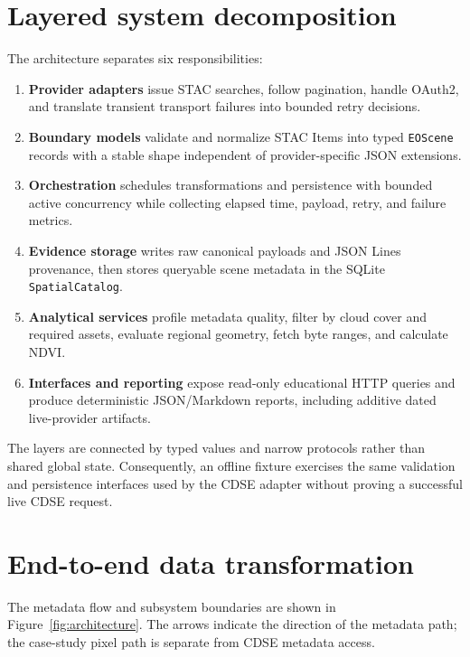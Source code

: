 \section{Layered system decomposition}

The architecture separates six responsibilities:

\begin{enumerate}
\item \textbf{Provider adapters} issue STAC searches, follow pagination, handle OAuth2, and
translate transient transport failures into bounded retry decisions.
\item \textbf{Boundary models} validate and normalize STAC Items into typed \texttt{EOScene}
records with a stable shape independent of provider-specific JSON extensions.
\item \textbf{Orchestration} schedules transformations and persistence with bounded active
concurrency while
collecting elapsed time, payload, retry, and failure metrics.
\item \textbf{Evidence storage} writes raw canonical payloads and JSON Lines provenance, then stores
queryable scene metadata in the SQLite \texttt{SpatialCatalog}.
\item \textbf{Analytical services} profile metadata quality, filter by cloud cover and required
assets, evaluate regional geometry, fetch byte ranges, and calculate NDVI.
\item \textbf{Interfaces and reporting} expose read-only educational HTTP queries and produce
deterministic JSON/Markdown reports, including additive dated live-provider artifacts.
\end{enumerate}

The layers are connected by typed values and narrow protocols rather than shared global state.
Consequently, an offline fixture exercises the same validation and persistence interfaces used
by the CDSE adapter without proving a successful live CDSE request.

\section{End-to-end data transformation}

The metadata flow and subsystem boundaries are shown in Figure~\ref{fig:architecture}.
The arrows indicate the direction of the metadata path; the case-study pixel path is
separate from CDSE metadata access.

